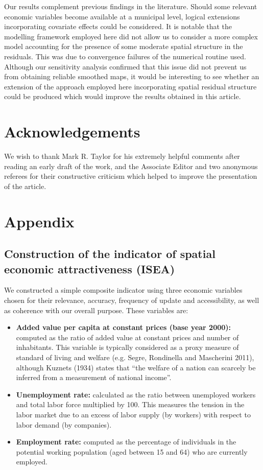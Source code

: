 Our results complement previous findings in the literature. Should some relevant economic variables become available at a municipal level, logical extensions incorporating covariate effects could be considered. It is notable that the modelling framework employed here did not allow us to consider a more complex model accounting for the presence of some moderate spatial structure in the residuals. This was due to convergence failures of the numerical routine used. Although our sensitivity analysis confirmed that this issue did not prevent us from obtaining reliable smoothed maps, it would be interesting to see whether an extension of the approach employed here incorporating spatial residual structure could be produced which would improve the results obtained in this article.

\section*{Acknowledgements}

We wish to thank Mark R. Taylor for his extremely helpful comments after reading an early draft of the work, and the Associate Editor and two anonymous referees for their constructive criticism which helped to improve the presentation of the article.

\section*{Appendix \label{NEX}}

\subsection*{Construction of the indicator of spatial economic attractiveness (ISEA) \label{ISEA}}

We constructed a simple composite indicator using three economic variables chosen for their relevance, accuracy, frequency of update and accessibility, as well as coherence with our overall purpose. These variables are:

\begin{itemize}
\item \textbf{Added value per capita at constant prices (base year 2000):} computed as the ratio of added value at constant prices and number of inhabitants. This variable is typically considered as a proxy measure of standard of living and welfare (e.g. Segre, Rondinella and Mascherini 2011), although Kuznets (1934) states that ``the welfare of a nation can scarcely be inferred from a measurement of national income''. 

\item \textbf{Unemployment rate:} calculated as the ratio between unemployed workers and total labor force multiplied by 100. This measures the tension in the labor market due to an excess of labor supply (by workers) with respect to labor demand (by companies).

\item \textbf{Employment rate:} computed as the percentage of individuals in the potential working population (aged between 15 and 64) who are currently employed.
\end{itemize}

